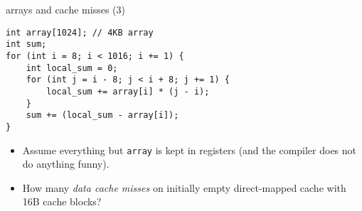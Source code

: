\begin{frame}[fragile,label=arrayMisses4]{arrays and cache misses (3)}
\begin{lstlisting}
int array[1024]; // 4KB array
int sum;
for (int i = 8; i < 1016; i += 1) {
    int local_sum = 0;
    for (int j = i - 8; j < i + 8; j += 1) {
        local_sum += array[i] * (j - i);
    }
    sum += (local_sum - array[i]);
}
\end{lstlisting}
    \begin{itemize}
        \item {\small
    Assume everything but {\tt array} is kept in registers (and the compiler does not do
    anything funny).
        }
    \item
        How many \textit{data cache misses} on initially empty  direct-mapped cache with 16B cache blocks?
    \end{itemize}
\end{frame}

